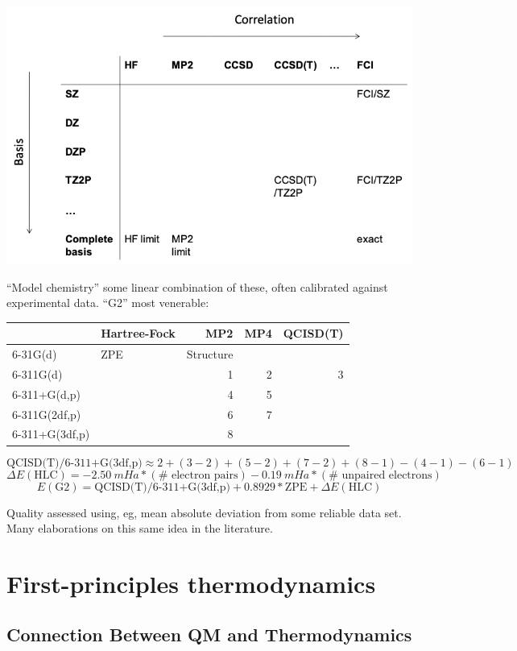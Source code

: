 \documentclass[11pt]{article}
\begin{document}
\begin{center}
\includegraphics[width=.9\linewidth]{./Images/model-chem.png}
\end{center}

``Model chemistry'' some linear combination of these, often calibrated against experimental data. ``G2'' most venerable:

\begin{center}
\begin{tabular}{llrrr}
 & Hartree-Fock & MP2 & MP4 & QCISD(T)\\
\hline
6-31G(d) & ZPE & Structure &  & \\
6-311G(d) &  & 1 & 2 & 3\\
6-311+G(d,p) &  & 4 & 5 & \\
6-311G(2df,p) &  & 6 & 7 & \\
6-311+G(3df,p) &  & 8 &  & \\
\end{tabular}
\end{center}

\[ \text{QCISD(T)/6-311+G(3df,p)} \approx 2 + (3-2) + (5-2) + (7-2) + (8-1) - (4-1) - (6-1)\]
\[ \Delta E(\text{HLC}) = \SI{-2.50}{mHa} * (\text{# electron pairs}) - \SI{0.19}{mHa}* (\text{# unpaired electrons}) \]
\[ E(\text{G2}) = \text{QCISD(T)/6-311+G(3df,p)} + 0.8929 * \text{ZPE} + \Delta E(\text{HLC})\]

Quality assessed using, eg, mean absolute deviation from some reliable data set. Many elaborations on this same idea in the literature.

\newpage
\section{First-principles thermodynamics}
\label{sec:org2af7ae6}
\subsection{Connection Between QM and Thermodynamics}
\label{sec:orgdda284f}
\end{document}
